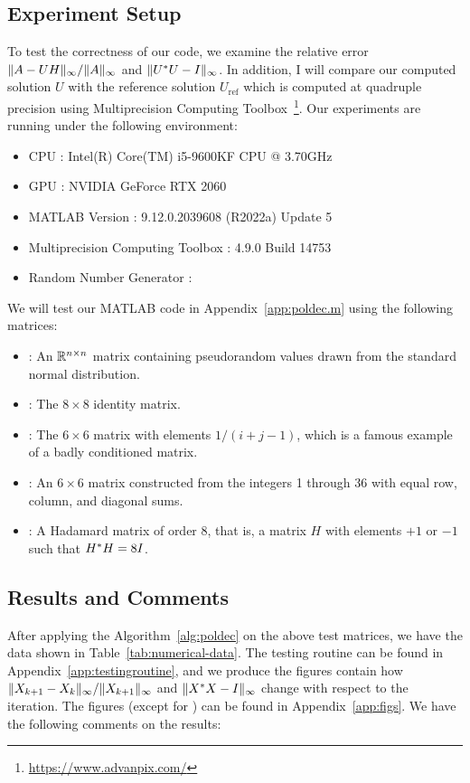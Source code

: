 \documentclass[12pt]{article}
\begin{document}
\subsection{Experiment Setup}
To test the correctness of our code, we examine the relative error $\|{A - UH}\|_{\infty}/\|{A}\|_\infty$ and $\|{U^* U - I}\|_\infty$. In addition, I will compare our computed solution $U$ with the reference solution $U_\mathrm{ref}$ which is computed at quadruple precision using Multiprecision Computing Toolbox~\footnote{\url{https://www.advanpix.com/}}.
Our experiments are running under the following environment:
\begin{itemize}
    \item CPU : Intel(R) Core(TM) i5-9600KF CPU @ 3.70GHz
    \item GPU : NVIDIA GeForce RTX 2060
    \item MATLAB Version : 9.12.0.2039608 (R2022a) Update 5
    \item Multiprecision Computing Toolbox : 4.9.0 Build 14753
    \item Random Number Generator : 
\end{itemize}

We will test our MATLAB code in Appendix~\ref{app:poldec.m} using the following matrices:
\begin{itemize}
    \item {} : An $\mathbb{R}^{n\times n}$ matrix containing pseudorandom values drawn
    from the standard normal distribution.
    \item {} : The $8\times 8$ identity matrix.
    \item {} : The $6\times 6$ matrix with elements $1/(i+j-1)$, which is a
    famous example of a badly conditioned matrix.
    \item {} : An $6\times 6$ matrix constructed from the integers
    1 through 36 with equal row, column, and diagonal sums.
    \item {} : A Hadamard matrix of order 8, that is, a matrix $H$
    with elements $+1$ or $-1$ such that $H^* H = 8I$.
\end{itemize}

\subsection{Results and Comments}
After applying the Algorithm~\ref{alg:poldec} on the above test matrices, we have the data shown in Table~\ref{tab:numerical-data}. The testing routine can be found in Appendix~\ref{app:testingroutine}, and we produce the figures contain how $\|{X_{k+1} - X_{k}}\|_\infty/\|{X_{k+1}}\|_\infty$ and $\|{X^* X - I}\|_\infty$ change with respect to the iteration. The figures (except for ) can be found in Appendix~\ref{app:figs}. We have the following comments on the results:
\end{document}

